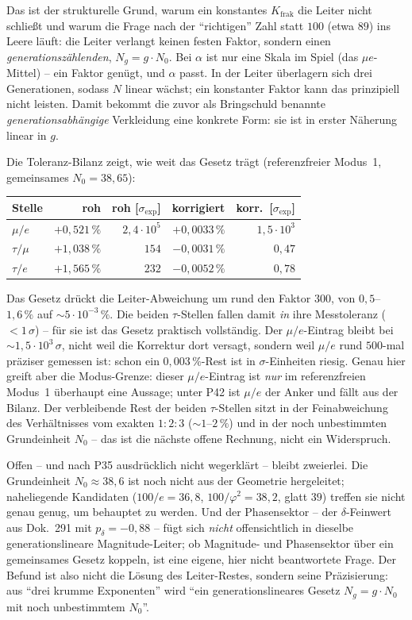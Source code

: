 Das ist der strukturelle Grund, warum ein konstantes $K_{\text{frak}}$ die
Leiter nicht schließt und warum die Frage nach der \enquote{richtigen}
Zahl statt $100$ (etwa $89$) ins Leere läuft: die Leiter verlangt keinen
festen Faktor, sondern einen \emph{generationszählenden}, $N_g=g\cdot N_0$.
Bei $\alpha$ ist nur eine Skala im Spiel (das $\mu e$-Mittel) -- ein Faktor
genügt, und $\alpha$ passt. In der Leiter überlagern sich drei Generationen,
sodass $N$ linear wächst; ein konstanter Faktor kann das prinzipiell nicht
leisten. Damit bekommt die zuvor als Bringschuld benannte
\emph{generationsabhängige} Verkleidung eine konkrete Form: sie ist in
erster Näherung linear in $g$.

Die Toleranz-Bilanz zeigt, wie weit das Gesetz trägt (referenzfreier
Modus~1, gemeinsames $N_0=38{,}65$):
\begin{center}
\begin{tabular}{lrrrr}
\hline
Stelle & roh & roh [$\sigma_{\text{exp}}$] & korrigiert & korr.\ [$\sigma_{\text{exp}}$]\\
\hline
$\mu/e$    & $+0{,}521\,\%$ & $2{,}4\cdot10^{5}$ & $+0{,}0033\,\%$ & $1{,}5\cdot10^{3}$\\
$\tau/\mu$ & $+1{,}038\,\%$ & $154$              & $-0{,}0031\,\%$ & $0{,}47$\\
$\tau/e$   & $+1{,}565\,\%$ & $232$              & $-0{,}0052\,\%$ & $0{,}78$\\
\hline
\end{tabular}
\end{center}
Das Gesetz drückt die Leiter-Abweichung um rund den Faktor $300$, von
$0{,}5$--$1{,}6\,\%$ auf $\sim5\cdot10^{-3}\,\%$. Die beiden
$\tau$-Stellen fallen damit \emph{in} ihre Messtoleranz ($<1\,\sigma$) --
für sie ist das Gesetz praktisch vollständig. Der $\mu/e$-Eintrag bleibt bei
$\sim1{,}5\cdot10^{3}\,\sigma$, nicht weil die Korrektur dort versagt,
sondern weil $\mu/e$ rund $500$-mal präziser gemessen ist: schon ein
$0{,}003\,\%$-Rest ist in $\sigma$-Einheiten riesig. Genau hier greift
aber die Modus-Grenze: dieser $\mu/e$-Eintrag ist \emph{nur} im
referenzfreien Modus~1 überhaupt eine Aussage; unter P42 ist $\mu/e$ der
Anker und fällt aus der Bilanz. Der verbleibende Rest der beiden
$\tau$-Stellen sitzt in der Feinabweichung des Verhältnisses vom exakten
$1:2:3$ ($\sim1$--$2\,\%$) und in der noch unbestimmten Grundeinheit $N_0$
-- das ist die nächste offene Rechnung, nicht ein Widerspruch.

Offen -- und nach P35 ausdrücklich nicht wegerklärt -- bleibt zweierlei. Die
Grundeinheit $N_0\approx38{,}6$ ist noch nicht aus der Geometrie
hergeleitet; naheliegende Kandidaten ($100/e=36{,}8$, $100/\varphi^2=38{,}2$,
glatt $39$) treffen sie nicht genau genug, um behauptet zu werden. Und der
Phasensektor -- der $\delta$-Feinwert aus Dok.~291 mit $p_\delta=-0{,}88$ --
fügt sich \emph{nicht} offensichtlich in dieselbe generationslineare
Magnitude-Leiter; ob Magnitude- und Phasensektor über ein gemeinsames Gesetz
koppeln, ist eine eigene, hier nicht beantwortete Frage. Der Befund ist also
nicht die Lösung des Leiter-Restes, sondern seine Präzisierung: aus
\enquote{drei krumme Exponenten} wird \enquote{ein generationslineares
Gesetz $N_g=g\cdot N_0$ mit noch unbestimmtem $N_0$}.

